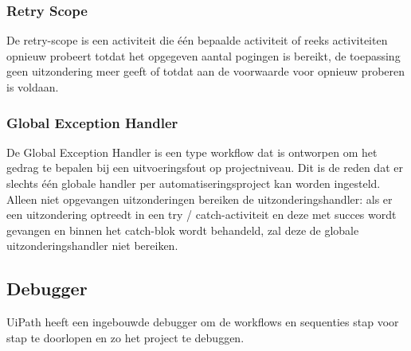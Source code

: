 \subsubsection{Retry Scope}
De retry-scope is een activiteit die één bepaalde activiteit of reeks activiteiten opnieuw probeert totdat het opgegeven aantal pogingen is bereikt, de toepassing geen uitzondering meer geeft of totdat aan de voorwaarde voor opnieuw proberen is voldaan.

\subsubsection{Global Exception Handler}
De Global Exception Handler is een type workflow dat is ontworpen om het gedrag te bepalen bij een uitvoeringsfout op projectniveau. Dit is de reden dat er slechts één globale handler per automatiseringsproject kan worden ingesteld. Alleen niet opgevangen uitzonderingen bereiken de uitzonderingshandler: als er een uitzondering optreedt in een try / catch-activiteit en deze met succes wordt gevangen en binnen het catch-blok wordt behandeld, zal deze de globale uitzonderingshandler niet bereiken.

\subsection{Debugger}
UiPath heeft een ingebouwde debugger om de workflows en sequenties stap voor stap te doorlopen en zo het project te debuggen.
